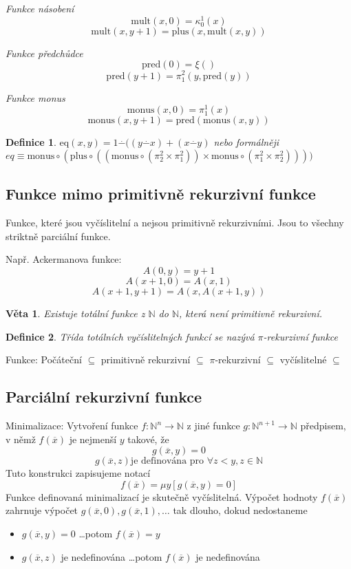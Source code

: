 \documentclass[a4paper, 11pt]{report}
\newtheorem{mydef}{Definice}[chapter]
\newtheorem{veta}{Věta}[chapter]
\begin{document}
\emph{Funkce násobení}
$$\text{mult}(x, 0) = \kappa_0^1(x)$$
$$\text{mult}(x, y+1) = \text{plus}(x, \text{mult}(x, y))$$

\emph{Funkce předchůdce}
$$\text{pred}(0) = \xi()$$
$$\text{pred}(y+1) = \pi_1^2(y, \text{pred}(y))$$

\emph{Funkce monus}
$$\text{monus}(x, 0) = \pi_1^1(x)$$
$$\text{monus}(x, y+1) = \text{pred}(\text{monus}(x, y))$$

\begin{mydef}
$\text{eq}(x, y) = 1 \overset{\cdot}{-} ((y\overset{\cdot}{-}x) + (x\overset{\cdot}{-}y)$ nebo formálněji $eq \equiv \text{monus} \circ (\text{plus} \circ ((\text{monus} \circ (\pi_2^2 \times \pi_1^2)) \times \text{monus} \circ (\pi_1^2 \times \pi_2^2))))$
\end{mydef}

\subsection{Funkce mimo primitivně rekurzivní funkce}
Funkce, které jsou vyčíslitelní a nejsou primitivně rekurzivními. Jsou to všechny striktně parciální funkce.

Např. Ackermanova funkce:
$$A(0, y) = y + 1$$
$$A(x+1, 0) = A(x, 1)$$
$$A(x+1, y+1) = A(x, A(x+1,y))$$

\begin{veta}
Existuje totální funkce z $\mathbb{N}$ do $\mathbb{N}$, která není primitivně rekurzivní.
\end{veta}

\begin{mydef}
Třída totálních vyčíslitelných funkcí se nazývá $\pi$-rekurzivní funkce
\end{mydef}

Funkce: Počáteční $\subseteq$
primitivně rekurzivní $\subseteq$
$\pi$-rekurzivní $\subseteq$
vyčíslitelné $\subseteq$

\subsection{Parciální rekurzivní funkce}
Minimalizace: Vytvoření funkce $f: \mathbb{N}^n \to \mathbb{N}$ z jiné funkce $g: \mathbb{N}^{n+1} \to \mathbb{N}$ předpisem, v němž $f(\overline{x})$ je nejmenší $y$ takové, že
$$g(\overline{x}, y) = 0$$
$$g(\overline{x}, z) \text{je definována pro } \forall z < y, z \in \mathbb{N}$$
Tuto konstrukci zapisujeme notací
$$f(\overline{x}) = \mu y [g(\overline{x}, y) = 0]$$
Funkce definovaná minimalizací je skutečně vyčíslitelná. Výpočet hodnoty $f(\overline{x})$ zahrnuje výpočet $g(\overline{x}, 0), g(\overline{x}, 1), \dots$ tak dlouho, dokud nedostaneme
\begin{itemize}
	\item $g(\overline{x}, y) = 0$ \dots potom $f(\overline{x}) = y$
	\item $g(\overline{x}, z) $ je nedefinována \dots potom $f(\overline{x})$ je nedefinována
\end{itemize}
\end{document}

